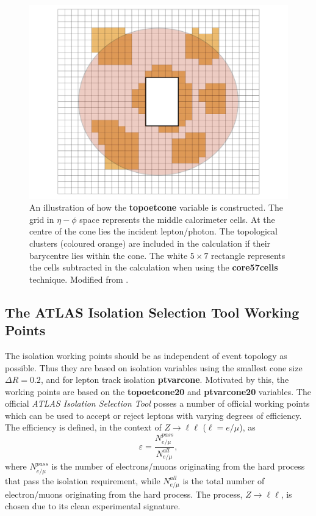 \begin{figure}
\centering
\includegraphics[scale=0.65]{images/topo_clusters.jpg}
\caption{An illustration of how the \textbf{topoetcone} variable is constructed. The grid in $\eta - \phi$ space represents the middle calorimeter cells. At the centre of the cone lies the incident lepton/photon. The topological clusters (coloured orange) are included in the calculation if their barycentre lies within the cone. The white $5 \times 7$ rectangle represents the cells subtracted in the calculation when using the \textbf{core57cells} technique. Modified from \cite{laplace}.}
\label{topo_clusters}
\end{figure}
\subsection{The ATLAS Isolation Selection Tool Working Points}
\label{AIST}
The isolation working points should be as independent of event topology as possible. Thus they are based on isolation variables using the smallest cone size $\Delta R = 0.2$, and for lepton track isolation \textbf{ptvarcone}. Motivated by this, the working points are based on the \textbf{topoetcone20} and \textbf{ptvarcone20} variables.
The official \emph{ATLAS Isolation Selection Tool} posses a number of official working points which can be used to accept or reject leptons with varying degrees of efficiency. The efficiency is defined, in the context of $Z \longrightarrow \ell \ell$ ($\ell = e/\mu$), as
$$\varepsilon =  \frac{N_{e/\mu}^{pass}}{N_{e/\mu}^{all}}, $$
where $N_{e/\mu}^{pass}$ is the number of electrons/muons originating from the hard process that pass the isolation requirement, while $N_{e/\mu}^{all}$ is the total number of electron/muons originating from the hard process. The process, $Z \longrightarrow \ell \ell$, is chosen due to its clean experimental signature.

